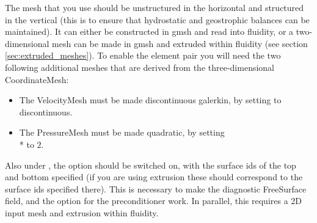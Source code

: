 The mesh that you use should be unstructured in the horizontal and structured
in the vertical (this is to ensure that hydrostatic and geostrophic balances can
be maintained). It can either be constructed in gmsh and read into fluidity, or
a two-dimensional mesh can be made in gmsh and extruded within fluidity (see
section \ref{sec:extruded_meshes}). To enable the \PoDGPt element pair you will need
the two following additional meshes that are derived from the three-dimensional
CoordinateMesh:
\begin{itemize}
\item The VelocityMesh must be made discontinuous galerkin, by setting
   to discontinuous.
\item The PressureMesh must be made quadratic, by setting
\\*   to $2$.
\end{itemize}
Also under , the  option
should be switched on, with the surface ids of the top and bottom specified (if
you are using extrusion these should correspond to the surface ids specified
there). This is necessary to make the diagnostic FreeSurface field, and the
 option for the  preconditioner work. In
parallel, this requires a 2D input mesh and extrusion within fluidity.

